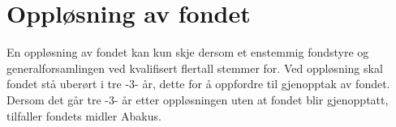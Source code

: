 \section{Oppløsning av fondet}
En oppløsning av fondet kan kun skje dersom et enstemmig fondstyre og
generalforsamlingen ved kvalifisert flertall stemmer for. Ved oppløsning skal
fondet stå uberørt i tre -3- år, dette for å oppfordre til gjenopptak av fondet.
Dersom det går tre -3- år etter oppløsningen uten at fondet blir gjenopptatt,
tilfaller fondets midler Abakus.
